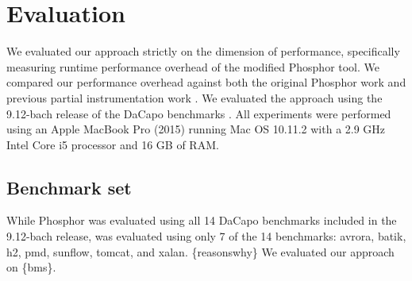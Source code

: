 \chapter{Evaluation}
We evaluated our approach strictly on the dimension of performance, specifically measuring runtime performance overhead of the modified Phosphor tool.  We compared our performance overhead against both the original Phosphor work \cite{phosphor_oopsla} and previous partial instrumentation work \cite{manoj_thesis}.  We evaluated the approach using the 9.12-bach release of the DaCapo benchmarks \cite{dacapobach}.  All experiments were performed using an Apple MacBook Pro (2015) running Mac OS 10.11.2 with a 2.9 GHz Intel Core i5 processor and 16 GB of RAM. 
\section{Benchmark set}
While Phosphor \cite{phosphor_oopsla} was evaluated using all 14 DaCapo benchmarks included in the 9.12-bach release, \cite{manoj_thesis} was evaluated using only 7 of the 14 benchmarks: avrora, batik, h2, pmd, sunflow, tomcat, and xalan. \{reasonswhy\}  We evaluated our approach on \{bms\}.
